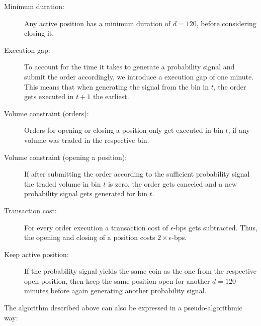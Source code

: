 \begin{description}
    \item[Minimum duration:] {
        Any active position has a minimum duration of $ d = 120 $, before considering closing it.
    }
    \item[Execution gap:] {
        To account for the time it takes to generate a probability signal and submit the order accordingly,
        we introduce a execution gap of one minute. This means that when generating the signal from the bin in $ t $,
        the order gets executed in $ t + 1 $ the earliest.
    }
    \item[Volume constraint (orders):] { 
        Orders for opening or closing a position only get executed in bin $ t $, 
        if any volume was traded in the respective bin.
    }
    \item[Volume constraint (opening a position):] {
        If after submitting the order according to the sufficient probability signal the traded volume in bin $ t $
        is zero, the order gets canceled and a new probability signal gets generated for bin $ t $.
    }
    \item[Transaction cost:] {
        For every order execution a transaction cost of $ \epsilon $-bps gets subtracted. 
        Thus, the opening and closing of a position costs $ 2 \times \epsilon $-bps.
    }
    \item[Keep active position:] {
        If the probability signal yields the same coin as the one from the respective open position,
        then keep the same position open for another $ d=120 $ minutes before again generating another
        probability signal.
    }
\end{description}


The algorithm described above can also be expressed in a pseudo-algorithmic way:

